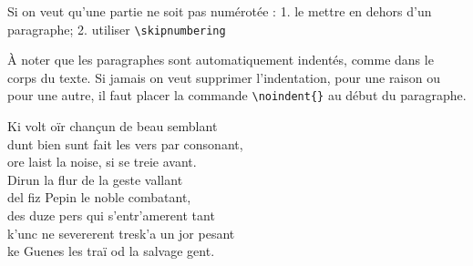 \documentclass[a4paper,twoside,french,12pt]{book}
\begin{document}
 Si on veut qu'une partie ne soit pas numérotée : 1. le mettre en dehors d'un paragraphe; 2. utiliser \verb=\skipnumbering=

À noter que les paragraphes sont automatiquement indentés, comme dans le corps du texte. Si jamais on veut supprimer l'indentation, pour une raison ou pour une autre, il faut placer la commande \verb=\noindent{}= au début du paragraphe.

 \bigskip
 \bigskip

 \beginnumbering
\pstart
Ki volt oïr chançun de beau semblant\\
dunt bien sunt fait les vers par consonant,\\
ore laist la noise, si se treie avant.\\
Dirun la flur de la geste vallant\\
del fiz Pepin le noble combatant,\\
des duze pers qui s'entr'amerent tant\\
k'unc ne severerent tresk'a un jor pesant\\
ke Guenes les traï od la salvage gent.\\
\pend
\end{document}
